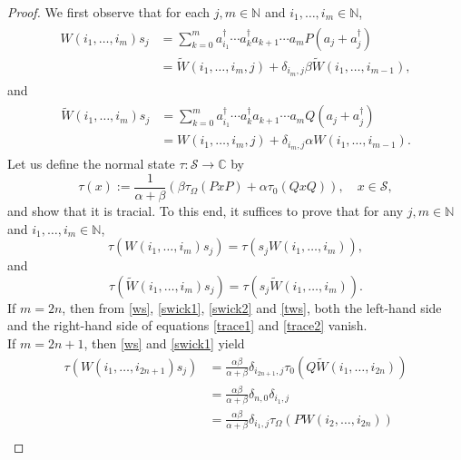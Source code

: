 \documentclass[12pt]{amsart}
\numberwithin{equation}{section}
\theoremstyle{definition}
\begin{document}
  \begin{proof}
We first observe that for each $j, m \in \mathbb{N}$ and $i_1, \ldots, i_m \in \mathbb{N}$,
\begin{align}
\begin{split}\label{ws}
W(i_1, \ldots, i_m) s_j
&= \sum_{k=0}^{m} a^\dagger_{i_1} \cdots a^\dagger_{k} a_{k+1} \cdots a_{m} P(a_j + a^\dagger_j) \\
&= \widetilde{W}(i_1, \ldots, i_m, j) + \delta_{i_m, j} \beta \widetilde{W}(i_1, \ldots, i_{m-1}),
\end{split}
\end{align}
and
\begin{align}
\begin{split}\label{tws}
\widetilde{W}(i_1, \ldots, i_m) s_j
&= \sum_{k=0}^{m} a^\dagger_{i_1} \cdots a^\dagger_{k} a_{k+1} \cdots a_{m} Q(a_j + a^\dagger_j) \\
&= W(i_1, \ldots, i_m, j) + \delta_{i_m, j} \alpha W(i_1, \ldots, i_{m-1}).
\end{split}
\end{align}
Let us define the normal state $\tau: \mathcal{S} \to \mathbb{C}$ by
\begin{equation}\label{trac}
\tau(x) := \frac{1}{\alpha + \beta} \left( \beta \tau_\Omega(PxP) + \alpha \tau_0(QxQ) \right), \quad x \in \mathcal{S},
\end{equation}
and show that it is tracial. To this end, it suffices to prove that for any $j, m \in \mathbb{N}$ and $i_1, \ldots, i_m \in \mathbb{N}$,
\begin{equation}\label{trace1}
\tau(W(i_1, \ldots, i_m) s_j) = \tau(s_j W(i_1, \ldots, i_m)),
\end{equation}
and
\begin{equation}\label{trace2}
\tau(\widetilde{W}(i_1, \ldots, i_m) s_j) = \tau(s_j \widetilde{W}(i_1, \ldots, i_m)).
\end{equation}
If $m=2n$, then from \eqref{ws}, \eqref{swick1}, \eqref{swick2} and \eqref{tws}, both the left-hand side and the right-hand side of equations \eqref{trace1} and \eqref{trace2} vanish.\\
If $m=2n+1$, then \eqref{ws} and \eqref{swick1} yield
\begin{align*}
\tau(W(i_1, \ldots, i_{2n+1}) s_j)
&= \frac{\alpha \beta}{\alpha + \beta} \delta_{i_{2n+1}, j} \tau_0(Q \widetilde{W}(i_1, \ldots, i_{2n})) \\
&= \frac{\alpha \beta}{\alpha + \beta} \delta_{n,0} \delta_{i_1, j} \\
&= \frac{\alpha \beta}{\alpha + \beta} \delta_{i_1, j} \tau_\Omega(P W(i_2, \ldots, i_{2n})) \\

\end{align*}
\end{proof}
\end{document}
